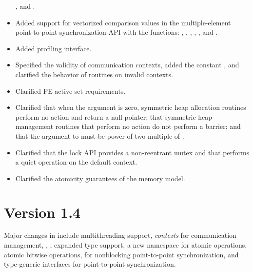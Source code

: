 \begin{itemize}
  , and .
%
%
\item Added support for vectorized comparison values in the multiple-element
  point-to-point synchronization \ac{API} with the functions:
  , ,
  ,
  , , and
  .
%
%
\item Added \openshmem profiling interface.
%
%
\item Specified the validity of communication contexts, added the constant
  , and clarified the behavior of
   routines on invalid contexts.
%
%
\item Clarified \ac{PE} active set requirements.
%
%
\item Clarified that when the  argument is zero, symmetric heap
    allocation routines perform no action and return a null pointer; that
    symmetric heap management routines that perform no action do not perform a
    barrier; and that the  argument to  must
    be power of two multiple of .
%
%
\item Clarified that the \openshmem lock \ac{API} provides a non-reentrant mutex and
    that  performs a quiet operation on the default
    context.
%
%
\item Clarified the atomicity guarantees of the \openshmem memory model.
%
%
\end{itemize}

\section{Version 1.4}
Major changes in \openshmem[1.4] include
multithreading support,
\emph{contexts} for communication management,
,
,
expanded type support,
a new namespace for atomic operations,
atomic bitwise operations,
 for nonblocking point-to-point synchronization,
and \Cstd[11] type-generic interfaces for point-to-point synchronization.

